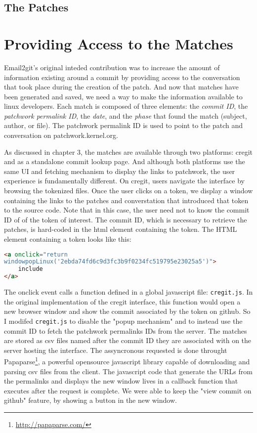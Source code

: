 \subsection{The Patches}








\section{Providing Access to the Matches}

Email2git's original inteded contribution was to increase the amount of information existing around a commit by providing access to the conversation that took place during the creation of the patch. And now that matches have been generated and saved, we need a way to make the information available to linux developers. Each match is composed of three elements: the \textit{commit ID}, the \textit{patchwork permalink ID}, the \textit{date}, and the \textit{phase} that found the match (subject, author, or file). The patchwork permalink ID is used to point to the patch and conversation on patchwork.kernel.org.

As discussed in chapter 3, the matches are available through two platforms: cregit and as a standalone commit lookup page. And although both platforms use the same UI and fetching mechanism to display the links to patchwork, the user experience is fundamentally different. On cregit, users navigate the interface by browsing the tokenized files. Once the user clicks on a token, we display a window containing the links to the patches and converstation that introduced that token to the source code. Note that in this case, the user need not to know the commit ID of of the token of interest. The commit ID, which is necessary to retrieve the patches, is hard-coded in the html element containing the token. The HTML element containing a token looks like this:

\begin{lstlisting}[language=HTML]
<a onclick="return 
windowpopLinux('2ebda74fd6c9d3fc3b9f0234fc519795e23025a5')">
	include
</a>
\end{lstlisting}

The onclick event calls a function defined in a global javascript file: \texttt{cregit.js}. In the original implementation of the cregit interface, this function would open a new browser window and show the commit associated by the token on github. So I modifed \texttt{cregit.js} to disable the "popup mechanism" and to instead use the commit ID to fetch the patchwork permalinks IDs from the server. The matches are stored as csv files named after the commit ID they are associated with on the server hosting the interface. The assyncronous requested is done throught Papaparse\footnote{\url{http://papaparse.com/}}, a powerful opensource javascript library capable of downloading and parsing csv files from the client. The javascript code that generate the URLs from the permalinks and displays the new window lives in a callback function that executes after the request is complete. We were able to keep the "view commit on github" feature, by showing a button in the new window.  

